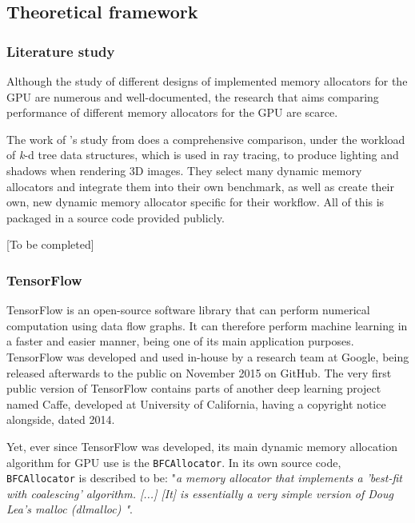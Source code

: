 \documentclass[12pt,twoside]{article}
\begin{document}
\subsection{Theoretical framework}
\label{sec:theoretical-framework}

\subsubsection*{Literature study}

Although the study of different designs of implemented memory allocators for the GPU are numerous and well-documented, the research that aims comparing performance of different memory allocators for the GPU are scarce. 

The work of \citeauthor{Vinkler2015}'s study from \citeyear{Vinkler2015} does a comprehensive comparison, under the workload of \textit{k}-d tree data structures, which is used in ray tracing, to produce lighting and shadows when rendering 3D images. They select many dynamic memory allocators and integrate them into their own benchmark, as well as create their own, new dynamic memory allocator specific for their workflow. All of this is packaged in a source code provided publicly.

[To be completed]

\subsubsection*{TensorFlow}

TensorFlow is an open-source software library that can perform numerical computation using data flow graphs. It can therefore perform machine learning in a faster and easier manner, being one of its main application purposes. TensorFlow was developed and used in-house by a research team at Google, being released afterwards to the public on November 2015 on GitHub. The very first public version of TensorFlow contains parts of another deep learning project named Caffe, developed at University of California, having a copyright notice alongside, dated 2014.

Yet, ever since TensorFlow was developed, its main dynamic memory allocation algorithm for GPU use is the \texttt{BFCAllocator}. In its own source code, \texttt{BFCAllocator} is described to be: "\textit{a memory allocator that implements a 'best-fit with coalescing' algorithm.  [...] [It] is essentially a very simple version of Doug Lea's malloc (dlmalloc) \cite{dlmalloc}"}.
\end{document}
